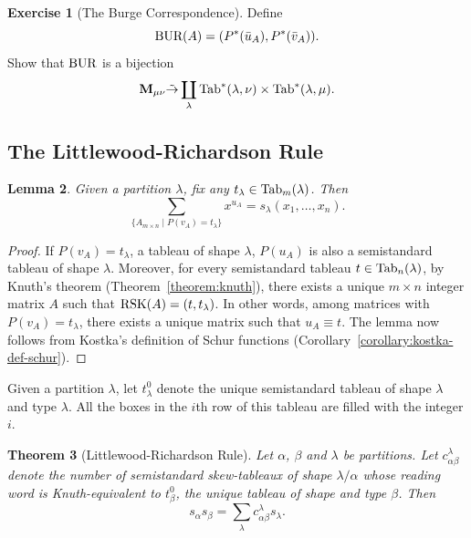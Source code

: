 \documentclass[11pt]{amsart}
\newtheorem{theorem}{Theorem}[subsection]
\newtheorem{lemma}[theorem]{Lemma}
\theoremstyle{definition}
\theoremstyle{example}
\newtheorem{exercise}[theorem]{Exercise}
\newcommand{\Tab}{\textup{Tab}}
\newcommand{\rsk}{\textup{RSK}}
\newcommand{\bur}{\textup{BUR}}
\begin{document}
\begin{exercise}
  [The Burge Correspondence]
  Define
  \begin{displaymath}
    \bur(A) = (P^*(\bar u_A), P^*(\bar v_A)).
  \end{displaymath}
  Show that $\bur$ is a bijection
  \begin{displaymath}
    \mathbf M_{\mu\nu}\tilde \to \coprod_\lambda \Tab^*(\lambda,\nu)\times \Tab^*(\lambda,\mu).
  \end{displaymath}
\end{exercise}
\subsection{The Littlewood-Richardson Rule}
\label{sec:littlewood-richardson}
\begin{lemma}
  \label{lemma:section}
  Given a partition $\lambda$, fix any $t_\lambda\in \Tab_m(\lambda)$.
  Then
  \begin{displaymath}
    \sum_{\{A_{m\times n}\mid P(v_A) = t_\lambda\}} x^{u_A} = s_\lambda(x_1,\dotsc,x_n).
  \end{displaymath}
\end{lemma}
\begin{proof}
  If $P(v_A) = t_\lambda$, a tableau of shape $\lambda$, $P(u_A)$ is also a semistandard tableau of shape $\lambda$.
  Moreover, for every semistandard tableau $t\in \Tab_n(\lambda)$,  by Knuth's theorem (Theorem~\ref{theorem:knuth}), there exists a unique $m\times n$ integer matrix $A$ such that $\rsk(A) = (t, t_\lambda)$.
  In other words, among matrices with $P(v_A)=t_\lambda$, there exists a unique matrix such that $u_A\equiv t$.
  The lemma now follows from Kostka's definition of Schur functions (Corollary~\ref{corollary:kostka-def-schur}).
\end{proof}
Given a partition $\lambda$, let $t^0_\lambda$ denote the unique semistandard tableau of shape $\lambda$ and type $\lambda$.
All the boxes in the $i$th row of this tableau are filled with the integer $i$.
\begin{theorem}
  [Littlewood-Richardson Rule]
  Let $\alpha$, $\beta$ and $\lambda$ be partitions.
  Let $c^\lambda_{\alpha\beta}$ denote the number of semistandard skew-tableaux of shape $\lambda/\alpha$ whose reading word is Knuth-equivalent to $t^0_\beta$, the unique tableau of shape and type $\beta$.
  Then
  \begin{displaymath}
    s_\alpha s_\beta = \sum_\lambda c^\lambda_{\alpha\beta} s_\lambda.
  \end{displaymath}
\end{theorem}
\end{document}

